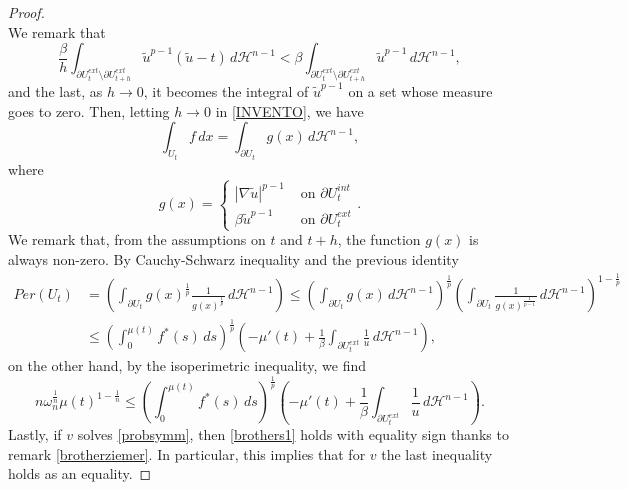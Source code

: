 \documentclass[12pt]{article}
\newcommand{\abs}[1]{{\left|#1\right|}}
\newcommand{\dH}{d\mathcal{H}^{n-1}}
\theoremstyle{definition}
\theoremstyle{plain}
\theoremstyle{definition}
\begin{document}
\begin{proof}
\begin{equation}
    \end{equation}
    We remark that
    \begin{equation*}
        \frac{\beta}{h}\int_{\partial U_{t}^{ext}\setminus\partial U_{t+h}^{ext}}\tilde u^{p-1}(\tilde u-t)\,\dH<\beta\int_{\partial U_{t}^{ext}\setminus\partial U_{t+h}^{ext}}\tilde u^{p-1}\,\dH,
    \end{equation*}
    and the last, as $h\rightarrow 0$, it becomes the integral of $\tilde u^{p-1}$ on a set whose measure goes to zero. Then, letting $h\rightarrow0$ in \eqref{INVENTO}, we have
    \begin{equation*}
        \int_{U_t}f\,dx=\int_{\partial U_t}g(x)\,\dH,
    \end{equation*}
    where 
    \begin{equation*}
        g(x)=\begin{cases}
            \abs{\nabla \tilde u}^{p-1}&\text{ on }\partial U_t^{int} \\
            \beta\tilde u^{p-1}&\text{ on }\partial U_t^{ext}
        \end{cases}.
    \end{equation*}
    We remark that, from the assumptions on $t$ and $t+h$, the function $g(x)$ is always non-zero.
    By Cauchy-Schwarz inequality and the previous identity
    \begin{equation*}
        \begin{split}
            Per(U_t)&=\left(\int_{\partial U_t}g(x)^\frac{1}{p}\frac{1}{g(x)^\frac{1}{p}}\,\dH\right)\leq\left(\int_{\partial U_t}g(x)\,\dH\right)^\frac{1}{p}\left(\int_{\partial U_t}\frac{1}{g(x)^\frac{1}{p-1}}\,\dH\right)^{1-\frac{1}{p}}\\ &\leq\left(\int_0^{\mu(t)}f^\ast(s)\,ds\right)^\frac{1}{p}\left(-\mu'(t)+\frac{1}{\beta}\int_{\partial U_t^{ext}}\frac{1}{u}\,\dH\right),
        \end{split}
    \end{equation*}
    on the other hand, by the isoperimetric inequality, we find
    \begin{equation*}
        n\omega_n^\frac{1}{n}\mu(t)^{1-\frac{1}{n}}\leq\left(\int_0^{\mu(t)}f^\ast(s)\,ds\right)^\frac{1}{p}\left(-\mu'(t)+\frac{1}{\beta}\int_{\partial U_t^{ext}}\frac{1}{u}\,\dH\right).
    \end{equation*}
     Lastly, if $v$ solves \eqref{probsymm}, then \eqref{brothers1} holds with equality sign thanks to
    remark \ref{brotherziemer}. In particular, this implies that for $v$ the last inequality holds as an equality.
\end{proof}
\end{document}
